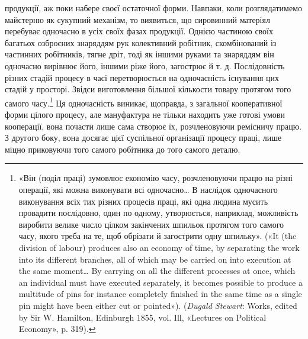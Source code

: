 \parcont{}  %
продукції, аж поки набере своєї остаточної форми. Навпаки, коли
розглядатимемо майстерню як сукупний механізм, то виявиться,
що сировинний матеріял перебуває одночасно в усіх своїх фазах
продукції. Однією частиною своїх багатьох озброєних знаряддям
рук колективний робітник, скомбінований із частинних робітників,
тягне дріт, тоді як іншими руками та знаряддям він одночасно
вирівнює його, іншими ріже його, загострює й т. д. Послідовність
різних стадій процесу в часі перетворюється на одночасність
існування цих стадій у просторі. Звідси виготовлення більшої
кількости товару протягом того самого часу.\footnote{
«Він (поділ праці) зумовлює економію часу, розчленовуючи
працю на різні операції, які можна виконувати всі одночасно\dots{} В наслідок
одночасного виконування всіх тих різних процесів праці, які одна
людина мусить провадити послідовно, один по одному, утворюється,
наприклад, можливість виробити велике число цілком закінчених
шпильок протягом того самого часу, якого треба на те, щоб обрізати й
загострити одну шпильку». («It (the division of labour) produces also
an economy of time, by separating the work into its different branches, all
of which may be carried on into execution at the same moment\dots{} By carrying
on all the different processes at once, which an individual must have
executed separately, it becomes possible to produce a multitude of pins
for instance completely finished in the same time as a single pin might
have been either cut or pointed»). (\emph{Dugald Stewart}: Works, edited
by Sir W. Hamilton, Edinburgh 1855, vol. Ill, «Lectures on Political
Economy», p. 319).
} Ця одночасність
виникає, щоправда, з загальної кооперативної форми цілого
процесу, але мануфактура не тільки находить уже готові умови
кооперації, вона почасти лише сама створює їх, розчленовуючи
ремісничу працю. З другого боку, вона досягає цієї суспільної
організації процесу праці, лише міцно приковуючи того самого
робітника до того самого деталю.

